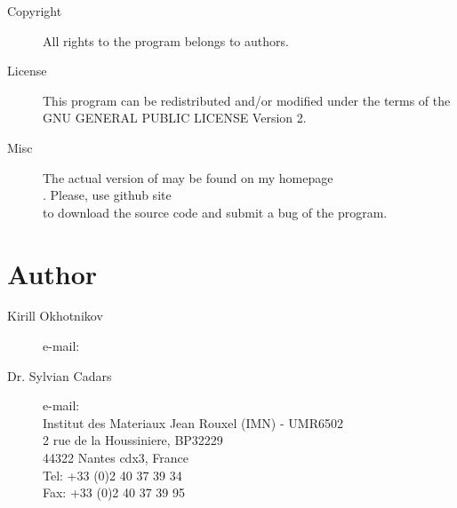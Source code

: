 \documentclass[a4paper,english]{article}
\begin{document}
\begin{description}
\item[Copyright] 
     All rights to the program belongs to authors.

\item[License] This program can be redistributed and/or modified under the
     terms of the GNU GENERAL PUBLIC LICENSE Version 2.

\item[Misc]
     The actual version of   may be found on my homepage\\
     . Please, use github site \\
     to download the source code and submit a bug of the program. 

\end{description}

\section{Author}
\begin{description}
\item[Kirill Okhotnikov]
e-mail: 

\item[Dr. Sylvian Cadars] 
e-mail:  \\
Institut des Materiaux Jean Rouxel (IMN) - UMR6502\\
2 rue de la Houssiniere, BP32229\\
44322 Nantes cdx3, France\\
Tel: +33 (0)2 40 37 39 34\\
Fax: +33 (0)2 40 37 39 95
\end{description}

\noindent

\LatexManEnd
\end{document}
